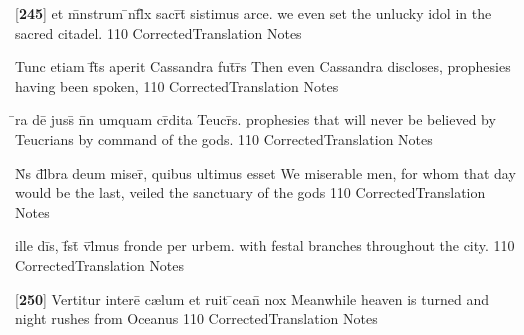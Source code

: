 \latline
  {[\textbf{245}] et m\={}nstrum \={\macron {\i}}nf\={}l\={\macron {\i}}x sacr\={}t\={} sistimus arce.}
  { we even set the unlucky idol in the sacred citadel. }
  {110}
  { CorrectedTranslation }
  { Notes }


\latline
  {Tunc etiam f\={}t\={\macron {\i}}s aperit Cassandra fut\={}r\={\macron {\i}}s}
  { Then even Cassandra discloses, prophesies having been spoken, }
  {110}
  { CorrectedTranslation }
  { Notes }


\latline
  {\={}ra de\={\macron {\i}}  juss\={} n\={}n umquam cr\={}dita Teucr\={\macron {\i}}s.}
  { prophesies that will never be believed by Teucrians by command of the gods.  }
  {110}
  { CorrectedTranslation }
  { Notes }


\latline
  {N\={}s d\={}l\={}bra deum miser\={\macron {\i}}, quibus ultimus esset}
  { We miserable men, for whom that day would be the last, veiled the sanctuary of the gods }
  {110}
  { CorrectedTranslation }
  { Notes }


\latline
  {ille di\={}s, f\={}st\={} v\={}l\={}mus fronde per urbem.}
  { with festal branches throughout the city. }
  {110}
  { CorrectedTranslation }
  { Notes }


\latline
  {[\textbf{250}] Vertitur intere\={} c{\ae}lum et ruit \={}cean\={} nox}
  { Meanwhile heaven is turned and night rushes from Oceanus }
  {110}
  { CorrectedTranslation }
  { Notes }


